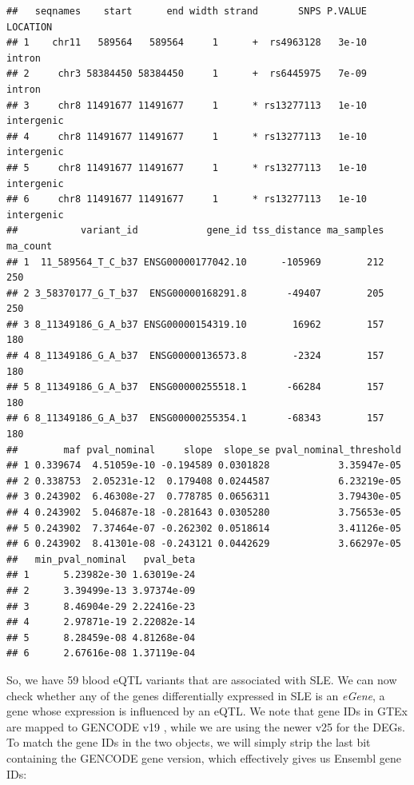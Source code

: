 \documentclass[9pt,a4paper,]{extarticle}
\begin{document}
\begin{verbatim}
##   seqnames    start      end width strand       SNPS P.VALUE   LOCATION
## 1    chr11   589564   589564     1      +  rs4963128   3e-10     intron
## 2     chr3 58384450 58384450     1      +  rs6445975   7e-09     intron
## 3     chr8 11491677 11491677     1      * rs13277113   1e-10 intergenic
## 4     chr8 11491677 11491677     1      * rs13277113   1e-10 intergenic
## 5     chr8 11491677 11491677     1      * rs13277113   1e-10 intergenic
## 6     chr8 11491677 11491677     1      * rs13277113   1e-10 intergenic
##           variant_id            gene_id tss_distance ma_samples ma_count
## 1  11_589564_T_C_b37 ENSG00000177042.10      -105969        212      250
## 2 3_58370177_G_T_b37  ENSG00000168291.8       -49407        205      250
## 3 8_11349186_G_A_b37 ENSG00000154319.10        16962        157      180
## 4 8_11349186_G_A_b37  ENSG00000136573.8        -2324        157      180
## 5 8_11349186_G_A_b37  ENSG00000255518.1       -66284        157      180
## 6 8_11349186_G_A_b37  ENSG00000255354.1       -68343        157      180
##        maf pval_nominal     slope  slope_se pval_nominal_threshold
## 1 0.339674  4.51059e-10 -0.194589 0.0301828            3.35947e-05
## 2 0.338753  2.05231e-12  0.179408 0.0244587            6.23219e-05
## 3 0.243902  6.46308e-27  0.778785 0.0656311            3.79430e-05
## 4 0.243902  5.04687e-18 -0.281643 0.0305280            3.75653e-05
## 5 0.243902  7.37464e-07 -0.262302 0.0518614            3.41126e-05
## 6 0.243902  8.41301e-08 -0.243121 0.0442629            3.66297e-05
##   min_pval_nominal   pval_beta
## 1      5.23982e-30 1.63019e-24
## 2      3.39499e-13 3.97374e-09
## 3      8.46904e-29 2.22416e-23
## 4      2.97871e-19 2.22082e-14
## 5      8.28459e-08 4.81268e-04
## 6      2.67616e-08 1.37119e-04
\end{verbatim}

So, we have 59 blood eQTL variants that are associated with SLE.
We can now check whether any of the genes differentially expressed in SLE is an \emph{eGene}, a gene whose expression is influenced by an eQTL.
We note that gene IDs in GTEx are mapped to GENCODE v19 \citep{GTEx2017a}, while we are using the newer v25 for the DEGs.
To match the gene IDs in the two objects, we will simply strip the last bit containing the GENCODE gene version, which effectively gives us Ensembl gene IDs:
\end{document}
